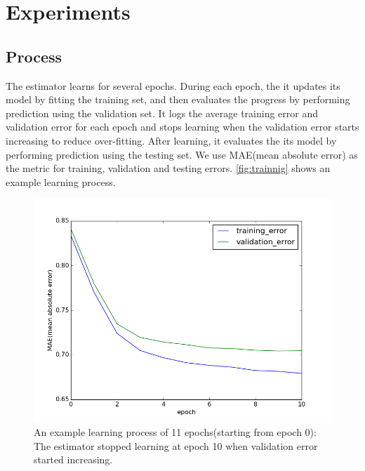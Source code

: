 \documentclass{article}
\begin{document}
\section{Experiments}

\subsection{Process}
The estimator learns for several epochs.
During each epoch, the it updates its model by fitting the training set, and 
then evaluates the progress by performing prediction using the validation set.
It logs the average training error and validation error for each epoch and 
stops learning when the validation error starts increasing to reduce 
over-fitting.
After learning, it evaluates the its model by performing prediction using the 
testing set.
We use MAE(mean absolute error) as the metric for training, validation and 
testing errors.
\autoref{fig:trainnig} shows an example learning process.
\begin{figure}[H]
	\centering
	\includegraphics[width=0.5\linewidth]{training}
	\caption{An example learning process of 11 epochs(starting from epoch 0): 
	The estimator stopped learning at epoch 10 when validation error started 
	increasing.}
	\label{fig:trainnig}
\end{figure}
\end{document}
